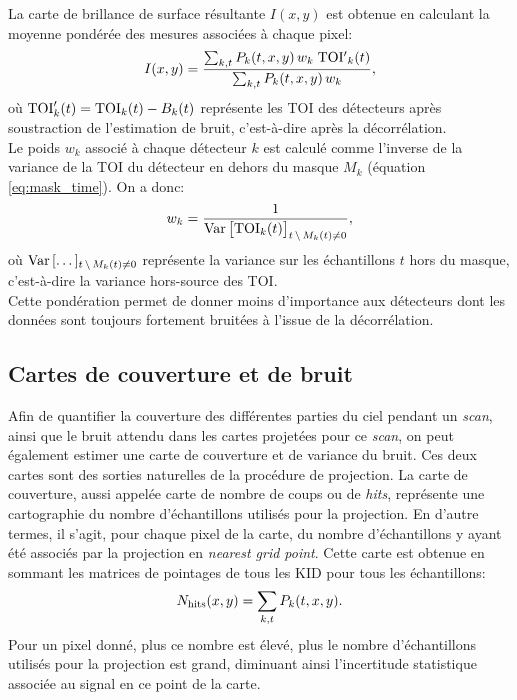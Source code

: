 La carte de brillance de surface résultante $I(x, y)$ est obtenue en calculant la moyenne pondérée des mesures associées à chaque pixel:
\begin{equation}
    \label{eq:map_projection}
    I(x, y) = \frac{\sum_{k, t} P_k(t, x, y) \, w_k \; {\rm TOI'}_k(t)}{\sum_{k, t} P_k(t, x, y) \, w_k},
\end{equation}
où ${\rm TOI}'_k(t) = {\rm TOI}_k(t) - B_k(t)$ représente les TOI des détecteurs après soustraction de l'estimation de bruit, c'est-à-dire après la décorrélation. \\
Le poids $w_k$ associé à chaque détecteur $k$ est calculé comme l'inverse de la variance de la TOI du détecteur en dehors du masque $M_k$ (équation \ref{eq:mask_time}).
On a donc:
\begin{equation}
    w_k = \frac{1}{{\rm Var}\,\big[{\rm TOI}_k(t)\big]_{t \,\backslash\, M_k(t) \neq 0}},
\end{equation}
où ${\rm Var}\,[\dots]_{t \,\backslash\, M_k(t) \neq 0}$ représente la variance sur les échantillons $t$ hors du masque, c'est-à-dire la variance hors-source des TOI. \\
Cette pondération permet de donner moins d'importance aux détecteurs dont les données sont toujours fortement bruitées à l'issue de la décorrélation.

\subsection{Cartes de couverture et de bruit}

Afin de quantifier la couverture des différentes parties du ciel pendant un \textit{scan}, ainsi que le bruit attendu dans les cartes projetées pour ce \textit{scan}, on peut également estimer une carte de couverture et de variance du bruit.
Ces deux cartes sont des sorties naturelles de la procédure de projection.
La carte de couverture, aussi appelée carte de nombre de coups ou de \textit{hits}, représente une cartographie du nombre d'échantillons utilisés pour la projection.
En d'autre termes, il s'agit, pour chaque pixel de la carte, du nombre d'échantillons y ayant été associés par la projection en \textit{nearest grid point}.
Cette carte est obtenue en sommant les matrices de pointages de tous les KID pour tous les échantillons:
\begin{equation}
    \label{}
    N_{\rm hits}(x, y) = \sum_{k, t} P_k(t, x, y).
\end{equation}
Pour un pixel donné, plus ce nombre est élevé, plus le nombre d'échantillons utilisés pour la projection est grand, diminuant ainsi l'incertitude statistique associée au signal en ce point de la carte.

